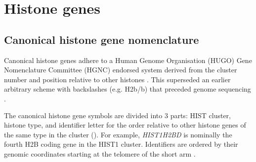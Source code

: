 \section{Histone genes}

  \subsection{Canonical histone gene nomenclature}
    Canonical histone genes adhere to a Human Genome Organisation (HUGO)
    Gene Nomenclature Committee (HGNC)
    endorsed system derived from the cluster number and position relative
    to other histones \citep{Marzluff02}.
    This superseded an earlier arbitrary scheme with backslashes (e.g. H2b/b)
    that preceded genome sequencing \citep{AlbigGenomics1997,AlbigHumangen1997}.

    The canonical histone gene symbols are divided into 3 parts:
    HIST cluster, histone type, and identifier letter
    for the order relative to other histone genes of the same type in
    the cluster ().
    For example, \textit{HIST1H2BD} is nominally the fourth H2B coding gene in the HIST1 cluster.
    Identifiers are ordered by their genomic coordinates starting at
    the telomere of the short arm \citep{Marzluff02}.

